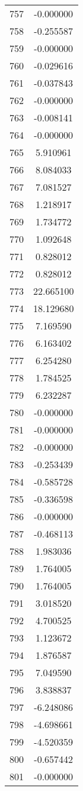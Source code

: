 \documentclass[12pt]{article}
\begin{document}
\begin{longtable}{@{}cc@{}}
757 & -0.000000 \\
758 & -0.255587 \\
759 & -0.000000 \\
760 & -0.029616 \\
761 & -0.037843 \\
762 & -0.000000 \\
763 & -0.008141 \\
764 & -0.000000 \\
765 & 5.910961 \\
766 & 8.084033 \\
767 & 7.081527 \\
768 & 1.218917 \\
769 & 1.734772 \\
770 & 1.092648 \\
771 & 0.828012 \\
772 & 0.828012 \\
773 & 22.665100 \\
774 & 18.129680 \\
775 & 7.169590 \\
776 & 6.163402 \\
777 & 6.254280 \\
778 & 1.784525 \\
779 & 6.232287 \\
780 & -0.000000 \\
781 & -0.000000 \\
782 & -0.000000 \\
783 & -0.253439 \\
784 & -0.585728 \\
785 & -0.336598 \\
786 & -0.000000 \\
787 & -0.468113 \\
788 & 1.983036 \\
789 & 1.764005 \\
790 & 1.764005 \\
791 & 3.018520 \\
792 & 4.700525 \\
793 & 1.123672 \\
794 & 1.876587 \\
795 & 7.049590 \\
796 & 3.838837 \\
797 & -6.248086 \\
798 & -4.698661 \\
799 & -4.520359 \\
800 & -0.657442 \\
801 & -0.000000 \\

\end{longtable}
\end{document}
